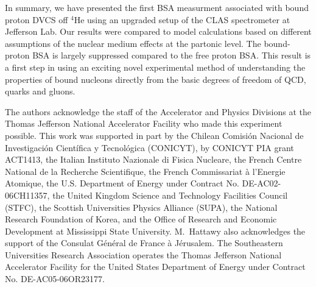 \documentclass[twocolumn,nofootinbib,showpacs,prl,superscriptaddress,secnumarabic,amssymb,nobibnotes,aps,floatfix]{revtex4}
\begin{document}
In summary, we have presented the first BSA measurment associated with bound 
proton DVCS off $^4$He using an upgraded setup of the CLAS spectrometer at 
Jefferson Lab. Our results were compared to model calculations based on 
different assumptions of the nuclear medium effects at the partonic level. The 
bound-proton BSA is largely suppressed compared to the free proton BSA. This 
result is a first step in using an exciting novel experimental method of 
understanding the properties of bound nucleons directly from the basic degrees 
of freedom of QCD, quarks and gluons.


The authors acknowledge the staff of the Accelerator and Physics Divisions at 
the Thomas Jefferson National Accelerator Facility who made this experiment 
possible. This work was supported in part by the Chilean Comisi\'on Nacional de 
Investigaci\'on Cient\'ifica y Tecnol\'ogica (CONICYT), by CONICYT PIA grant 
ACT1413, the Italian Instituto Nazionale di Fisica Nucleare, the French Centre 
National de la Recherche Scientifique, the French Commissariat \`a l'Energie 
Atomique, the U.S.  Department of Energy under Contract No. DE-AC02-06CH11357, 
the United Kingdom Science and Technology Facilities Council (STFC), the 
Scottish Universities Physics Alliance (SUPA), the National Research Foundation 
of Korea, and the Office of Research and Economic Development at Mississippi 
State University.  M.~Hattawy also acknowledges the support of the Consulat 
G\'en\'eral de France \`a J\'erusalem.  The Southeastern Universities Research 
Association operates the Thomas Jefferson National Accelerator Facility for the 
United States Department of Energy under Contract No. DE-AC05-06OR23177.
\end{document}
